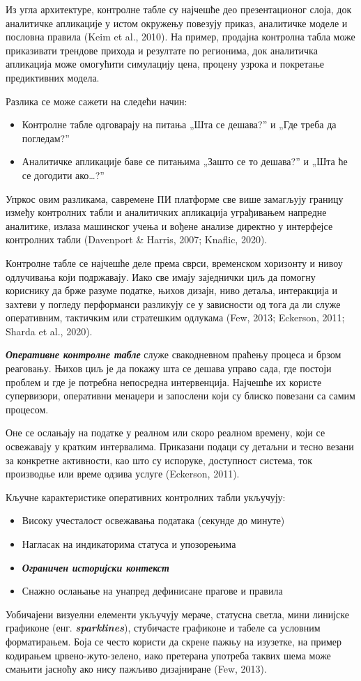 Из угла архитектуре, контролне табле су најчешће део презентационог слоја, док аналитичке апликације у истом окружењу повезују приказ, аналитичке моделе и пословна правила (Keim et al., 2010). На пример, продајна контролна табла може приказивати трендове прихода и резултате по регионима, док аналитичка апликација може омогућити симулацију цена, процену узрока и покретање предиктивних модела.

Разлика се може сажети на следећи начин:

\begin{itemize}
  \item Контролне табле одговарају на питања „Шта се дешава?” и „Где треба да погледам?”
  \item Аналитичке апликације баве се питањима „Зашто се то дешава?” и „Шта ће се догодити ако…?”
\end{itemize}
Упркос овим разликама, савремене ПИ платформе све више замагљују границу између контролних табли и аналитичких апликација уграђивањем напредне аналитике, излаза машинског учења и вођене анализе директно у интерфејсе контролних табли (Davenport \& Harris, 2007; Knaflic, 2020).

Контролне табле се најчешће деле према сврси, временском хоризонту и нивоу одлучивања који подржавају. Иако све имају заједнички циљ да помогну кориснику да брже разуме податке, њихов дизајн, ниво детаља, интеракција и захтеви у погледу перформанси разликују се у зависности од тога да ли служе оперативним, тактичким или стратешким одлукама (Few, 2013; Eckerson, 2011; Sharda et al., 2020).

\textbf{\textit{Оперативне контролне табле}} служе свакодневном праћењу процеса и брзом реаговању. Њихов циљ је да покажу шта се дешава управо сада, где постоји проблем и где је потребна непосредна интервенција. Најчешће их користе супервизори, оперативни менаџери и запослени који су блиско повезани са самим процесом.

Оне се ослањају на податке у реалном или скоро реалном времену, који се освежавају у кратким интервалима. Приказани подаци су детаљни и тесно везани за конкретне активности, као што су испоруке, доступност система, ток производње или време одзива услуге (Eckerson, 2011).

Кључне карактеристике оперативних контролних табли укључују:

\begin{itemize}
  \item Високу учесталост освежавања података (секунде до минуте)
  \item Нагласак на индикаторима статуса и упозорењима
  \item \textbf{\textit{Ограничен историјски контекст}}
  \item Снажно ослањање на унапред дефинисане прагове и правила
\end{itemize}
Уобичајени визуелни елементи укључују мераче, статусна светла, мини линијске графиконе (енг. \textbf{\textit{sparklines}}), стубичасте графиконе и табеле са условним форматирањем. Боја се често користи да скрене пажњу на изузетке, на пример кодирањем црвено-жуто-зелено, иако претерана употреба таквих шема може смањити јасноћу ако нису пажљиво дизајниране (Few, 2013).

